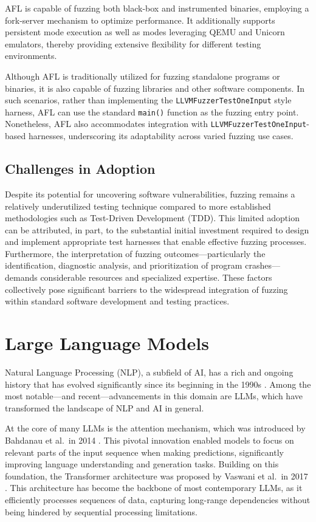 \documentclass[
  a4paper,
]{scrreprt}
\theoremstyle{definition}
\theoremstyle{remark}
\begin{document}
AFL is capable of fuzzing both black-box and instrumented binaries,
employing a fork-server mechanism to optimize performance. It
additionally supports persistent mode execution as well as modes
leveraging QEMU and Unicorn emulators, thereby providing extensive
flexibility for different testing environments.

Although AFL is traditionally utilized for fuzzing standalone programs
or binaries, it is also capable of fuzzing libraries and other software
components. In such scenarios, rather than implementing the
\texttt{LLVMFuzzerTestOneInput} style harness, AFL can use the standard
\texttt{main()} function as the fuzzing entry point. Nonetheless, AFL
also accommodates integration with \texttt{LLVMFuzzerTestOneInput}-based
harnesses, underscoring its adaptability across varied fuzzing use
cases.

\subsection{Challenges in Adoption}\label{challenges-in-adoption}

Despite its potential for uncovering software vulnerabilities, fuzzing
remains a relatively underutilized testing technique compared to more
established methodologies such as Test-Driven Development (TDD). This
limited adoption can be attributed, in part, to the substantial initial
investment required to design and implement appropriate test harnesses
that enable effective fuzzing processes. Furthermore, the interpretation
of fuzzing outcomes---particularly the identification, diagnostic
analysis, and prioritization of program crashes---demands considerable
resources and specialized expertise. These factors collectively pose
significant barriers to the widespread integration of fuzzing within
standard software development and testing practices.

\section{Large Language Models}\label{large-language-models}

Natural Language Processing (NLP), a subfield of AI, has a rich and
ongoing history that has evolved significantly since its beginning in
the 1990s \autocite{li2022,wang2025}. Among the most notable---and
recent---advancements in this domain are LLMs, which have transformed
the landscape of NLP and AI in general.

At the core of many LLMs is the attention mechanism, which was
introduced by Bahdanau et al.~in 2014 \autocite{bahdanau2016}. This
pivotal innovation enabled models to focus on relevant parts of the
input sequence when making predictions, significantly improving language
understanding and generation tasks. Building on this foundation, the
Transformer architecture was proposed by Vaswani et al.~in 2017
\autocite{vaswani2023}. This architecture has become the backbone of
most contemporary LLMs, as it efficiently processes sequences of data,
capturing long-range dependencies without being hindered by sequential
processing limitations.
\end{document}
